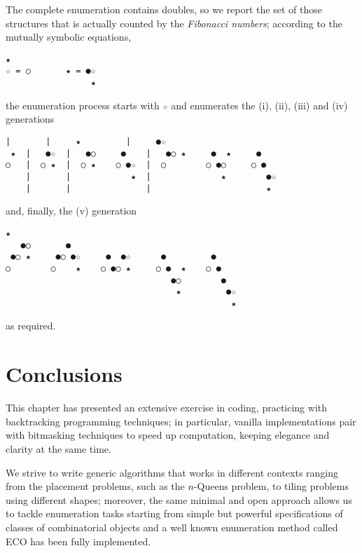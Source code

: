\noindent The complete enumeration contains doubles, so we report the set of those
structures that is actually counted by the \textit{Fibonacci numbers};
according to the mutually symbolic equations,
\begin{Verbatim}[baselinestretch=0.5]
     ★
☆ = ○       ★ = ●☆
                 ★
\end{Verbatim}
the enumeration process starts with \verb|☆| and enumerates the (i), (ii),
(iii) and (iv) generations
\begin{Verbatim}[baselinestretch=0.5]
    |       |     ★         |     ●☆          
 ★  |   ●☆  |   ●○     ●    |   ●○ ★     ●  ★     ● 
○   |  ○ ★  |  ○ ★    ○ ●☆  |  ○        ○ ●○     ○ ●
    |       |            ★  |              ★        ●☆
    |       |               |                       ★
\end{Verbatim}
and, finally, the (v) generation
\begin{Verbatim}[baselinestretch=0.5]
     ★
   ●○       ●              
 ●○ ★     ●○ ●☆     ●  ●☆      ●         ●
○        ○    ★    ○ ●○ ★     ○ ●  ★    ○ ●
                                 ●○        ●
                                  ★         ●☆
                                             ★
\end{Verbatim}
as required.

\section*{Conclusions}

This chapter has presented an extensive exercise in coding, practicing with
backtracking programming techniques; in particular, vanilla implementations
pair with bitmasking techniques to speed up computation, keeping elegance and
clarity at the same time.

We strive to write generic algorithms that works in different contexts ranging
from the placement problems, such as the $n$-Queens problem, to tiling problems
using different shapes; moreover, the same minimal and open approach allows us
to tackle enumeration tasks starting from simple but powerful specifications of
classes of combinatorial objects and a well known enumeration method called ECO
has been fully implemented.
